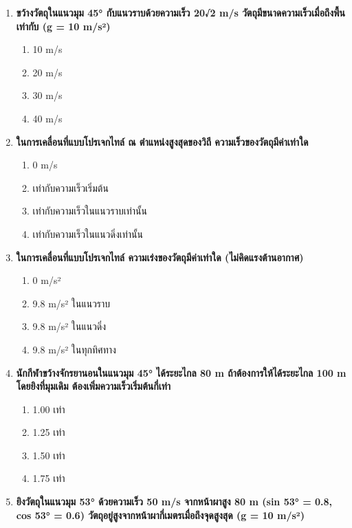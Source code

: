 \documentclass[12pt]{article}
\begin{document}
\begin{enumerate}
\begin{enumerate}[label=\alph*)]
\item θ = 30°
\item θ = 45°
\item θ = 60°
\item θ = 75°
\end{enumerate}
\item \textbf{ขว้างวัตถุในแนวมุม 45° กับแนวราบด้วยความเร็ว 20√2 m/s วัตถุมีขนาดความเร็วเมื่อถึงพื้นเท่ากับ (g = 10 m/s²)}
\begin{enumerate}[label=\alph*)]
\item 10 m/s
\item 20 m/s
\item 30 m/s
\item 40 m/s
\end{enumerate}
\item \textbf{ในการเคลื่อนที่แบบโปรเจกไทล์ ณ ตำแหน่งสูงสุดของวิถี ความเร็วของวัตถุมีค่าเท่าใด}
\begin{enumerate}[label=\alph*)]
\item 0 m/s
\item เท่ากับความเร็วเริ่มต้น
\item เท่ากับความเร็วในแนวราบเท่านั้น
\item เท่ากับความเร็วในแนวดิ่งเท่านั้น
\end{enumerate}
\item \textbf{ในการเคลื่อนที่แบบโปรเจกไทล์ ความเร่งของวัตถุมีค่าเท่าใด (ไม่คิดแรงต้านอากาศ)}
\begin{enumerate}[label=\alph*)]
\item 0 m/s²
\item 9.8 m/s² ในแนวราบ
\item 9.8 m/s² ในแนวดิ่ง
\item 9.8 m/s² ในทุกทิศทาง
\end{enumerate}
\item \textbf{นักกีฬาขว้างจักรยานอนในแนวมุม 45° ได้ระยะไกล 80 m ถ้าต้องการให้ได้ระยะไกล 100 m โดยยิงที่มุมเดิม ต้องเพิ่มความเร็วเริ่มต้นกี่เท่า}
\begin{enumerate}[label=\alph*)]
\item 1.00 เท่า
\item 1.25 เท่า
\item 1.50 เท่า
\item 1.75 เท่า
\end{enumerate}
\item \textbf{ยิงวัตถุในแนวมุม 53° ด้วยความเร็ว 50 m/s จากหน้าผาสูง 80 m (sin 53° = 0.8, cos 53° = 0.6) วัตถุอยู่สูงจากหน้าผากี่เมตรเมื่อถึงจุดสูงสุด (g = 10 m/s²)}
\begin{enumerate}[label=\alph*)]

\end{enumerate}
\end{enumerate}
\end{document}
